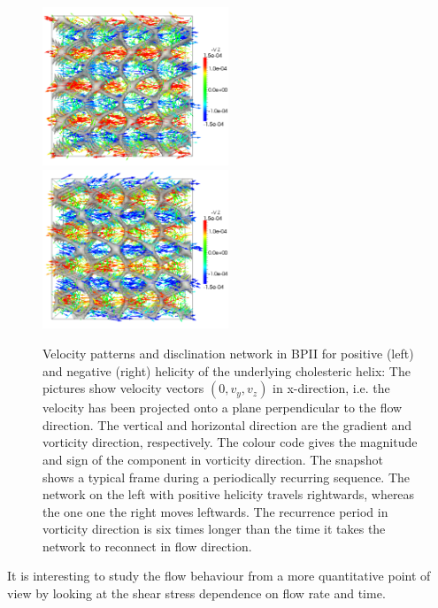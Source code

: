\documentclass[aps,pre,reprint,superscriptaddress]{revtex4}
\begin{document}
\begin{figure}[h]
\includegraphics[width=0.495\textwidth]{v_yz-v_z-160k_run902.png}
\includegraphics[width=0.495\textwidth]{v_yz-v_z-160k_run903.png}
\caption{Velocity patterns and disclination network in BPII for positive (left) and negative (right) helicity of the 
underlying cholesteric helix: 
The pictures show velocity vectors $(0,v_y,v_z)$ in x-direction, i.e. the velocity has been projected onto a 
plane perpendicular to the flow direction. The vertical and horizontal direction are the gradient and vorticity 
direction, respectively.
The colour code gives the magnitude and sign of the component in vorticity direction.
The snapshot shows a typical frame during a periodically recurring sequence.
The network on the left with positive helicity travels rightwards, whereas the one one the right
moves leftwards.
The recurrence period in vorticity direction is six times longer than the time it takes the network 
to reconnect in flow direction.}
\label{bp2-velo}
\end{figure}


It is interesting to study the flow behaviour from a more quantitative point of view by looking at the shear stress dependence on flow rate and time. 
\end{document}
